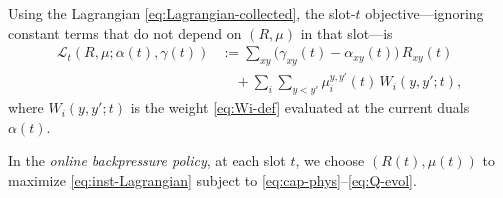 \documentclass[11pt]{article}
\begin{document}



Using the Lagrangian \eqref{eq:Lagrangian-collected}, the slot-$t$ objective—ignoring constant terms that do not depend on $(R,\mu)$ in that slot—is
\begin{equation}
\begin{aligned}
\mathcal{L}_t(R,\mu;\alpha(t),\gamma(t))
&:= \sum_{xy}
\big(\gamma_{xy}(t)-\alpha_{xy}(t)\big)\,R_{xy}(t) \\
&\quad + \sum_i \sum_{y<y'}
\mu_i^{y,y'}(t)\,W_i(y,y';t),
\end{aligned}
\label{eq:inst-Lagrangian}
\end{equation}
where $W_i(y,y';t)$ is the weight \eqref{eq:Wi-def} evaluated at the current duals $\alpha(t)$.

In the \emph{online backpressure policy}, at each slot $t$, we choose $(R(t),\mu(t))$ to maximize \eqref{eq:inst-Lagrangian} subject to \eqref{eq:cap-phys}--\eqref{eq:Q-evol}.
\end{document}
